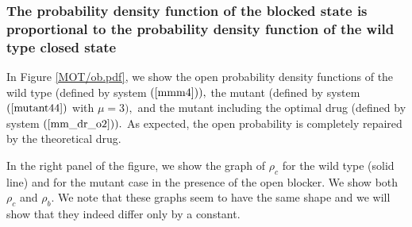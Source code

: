 \bigskip

\subsubsection{The probability density function of the blocked state is
proportional to the probability density function of the wild type closed state}


In Figure \ref{MOT/ob.pdf}, we show the open probability density functions of the
wild type
(defined by system $\left(  \ref{mmm4}\right)  ),$ the mutant (defined by system $\left(  \ref{mutant44}\right)  $ with $\mu=3),$ 
and the mutant including the optimal drug (defined by system 
$\left(  \ref{mm_dr_o2} \right)  ).$ As expected, the open probability is 
completely repaired by the theoretical drug.

In the right panel of the figure, we show the graph of $\rho_{c}$ for the wild type
(solid line) and for the mutant case in the presence of the open blocker. We show
both $\rho_{c}$ and $\rho_{b}$. We note that these graphs seem to have the same 
shape  and we will show that they indeed differ only by a constant. 

